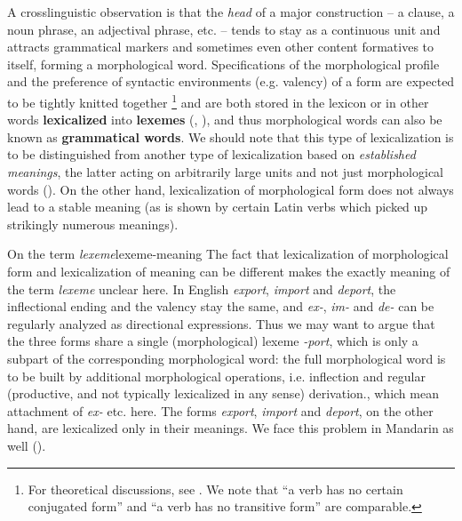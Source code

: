 \documentclass[UTF8, a4paper, oneside, scheme=plain, 12pt]{ctexrep}
\newcommand*{\concept}[1]{\textbf{#1}}
\newcommand*{\term}[1]{\emph{#1}}
\newcommand{\form}[1]{\emph{#1}}
\begin{document}
A crosslinguistic observation is that the \emph{head} of a major construction -- a clause, a noun phrase, an adjectival phrase, etc. --
tends to stay as a continuous unit and attracts grammatical markers and sometimes even other content formatives to itself,
forming a morphological word.
Specifications of the morphological profile
and the preference of syntactic environments (e.g. valency) of a form
are expected to be tightly knitted together%
\footnote{
    For theoretical discussions, see .
    We note that ``a verb has no certain conjugated form''
    and ``a verb has no transitive form'' are comparable.
}
and are both stored in the lexicon or in other words \concept{lexicalized} into \concept{lexemes} (, ),
and thus morphological words can also be known as \concept{grammatical words}.
We should note that this type of lexicalization is to be distinguished from another type of lexicalization based on \emph{established meanings},
the latter acting on arbitrarily large units and not just morphological words ().
On the other hand, lexicalization of morphological form does not always lead to a stable meaning 
(as is shown by certain Latin verbs which picked up strikingly numerous meanings).

\begin{theorybox}{On the term \term{lexeme}}{lexeme-meaning}
    The fact that lexicalization of morphological form and lexicalization of meaning
    can be different makes the exactly meaning of the term \term{lexeme} unclear here.
    In English \form{export}, \form{import} and \form{deport},
    the inflectional ending and the valency stay the same,
    and \form{ex-}, \form{im-} and \form{de-} can be regularly analyzed as directional expressions.
    Thus we may want to argue that the three forms share a single (morphological) lexeme \form{-port},
    which is only a subpart of the corresponding morphological word:
    the full morphological word is to be built by additional morphological operations,
    i.e. inflection and regular (productive, and not typically lexicalized in any sense) derivation.,
    which mean attachment of \form{ex-} etc. here.
    The forms \form{export}, \form{import} and \form{deport}, on the other hand,
    are lexicalized only in their meanings.
    We face this problem in Mandarin as well ().
\end{theorybox}
\end{document}
